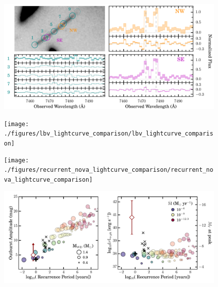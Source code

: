 \begin{figure}[tbp]
  \begin{center}
    \includegraphics[width=\textwidth]{./figures/muse_oii_sequence/muse_oii_sequence}
    \caption{\protect}
  \end{center}
\end{figure}

\begin{figure}[tbp]
  \begin{center}
    \texttt{[image: ./figures/lbv\_lightcurve\_comparison/lbv\_lightcurve\_comparison]}
    \caption{\protect}
  \end{center}
\end{figure}

\begin{figure}[tbp]
  \begin{center}
    \texttt{[image: ./figures/recurrent\_nova\_lightcurve\_comparison/recurrent\_nova\_lightcurve\_comparison]}
    \caption{\protect}
  \end{center}
\end{figure}

\begin{figure}[tbp]
  \begin{center}
    \includegraphics[width=\textwidth]{./figures/recurrent_nova_recurrence_comparison/recurrent_nova_recurrence_comparison}
    \caption{\protect}
  \end{center}
\end{figure}


